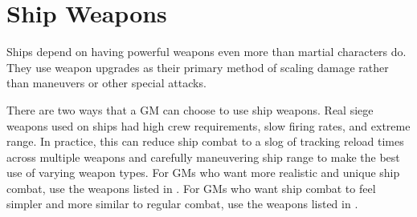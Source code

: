 
\section{Ship Weapons}\label{Ship Weapons}
    Ships depend on having powerful weapons even more than martial characters do.
    They use weapon upgrades as their primary method of scaling damage rather than maneuvers or other special attacks.

    There are two ways that a GM can choose to use ship weapons.
    Real siege weapons used on ships had high crew requirements, slow firing rates, and extreme range.
    In practice, this can reduce ship combat to a slog of tracking reload times across multiple weapons and carefully maneuvering ship range to make the best use of varying weapon types.
    For GMs who want more realistic and unique ship combat, use the weapons listed in .
    For GMs who want ship combat to feel simpler and more similar to regular combat, use the weapons listed in .

